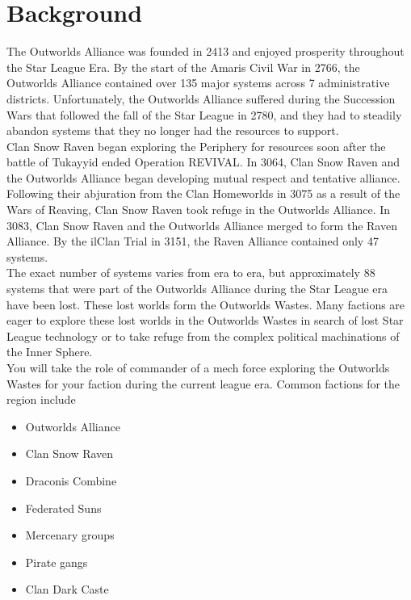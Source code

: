 \documentclass[UTF8]{article}
\begin{document}
\newpage

\tableofcontents
\newpage

\section{Background}

The Outworlds Alliance was founded in 2413 and enjoyed prosperity throughout the Star League Era.
By the start of the Amaris Civil War in 2766, the Outworlds Alliance contained over 135 major systems across 7 administrative districts.
Unfortunately, the Outworlds Alliance suffered during the Succession Wars that followed the fall of the Star League in 2780, and they had to steadily abandon systems that they no longer had the resources to support.\\

Clan Snow Raven began exploring the Periphery for resources soon after the battle of Tukayyid ended Operation REVIVAL.
In 3064, Clan Snow Raven and the Outworlds Alliance began developing mutual respect and tentative alliance.
Following their abjuration from the Clan Homeworlds in 3075 as a result of the Wars of Reaving, Clan Snow Raven took refuge in the Outworlds Alliance.
In 3083, Clan Snow Raven and the Outworlds Alliance merged to form the Raven Alliance.
By the ilClan Trial in 3151, the Raven Alliance contained only 47 systems.\\

The exact number of systems varies from era to era, but approximately 88 systems that were part of the Outworlds Alliance during the Star League era have been lost.
These lost worlds form the Outworlds Wastes.
Many factions are eager to explore these lost worlds in the Outworlds Wastes in search of lost Star League technology or to take refuge from the complex political machinations of the Inner Sphere.\\

You will take the role of commander of a mech force exploring the Outworlds Wastes for your faction during the current league era.
Common factions for the region include

\begin{itemize}

\item Outworlds Alliance

\item Clan Snow Raven

\item Draconis Combine

\item Federated Suns

\item Mercenary groups

\item Pirate gangs

\item Clan Dark Caste

\end{itemize}
\end{document}
